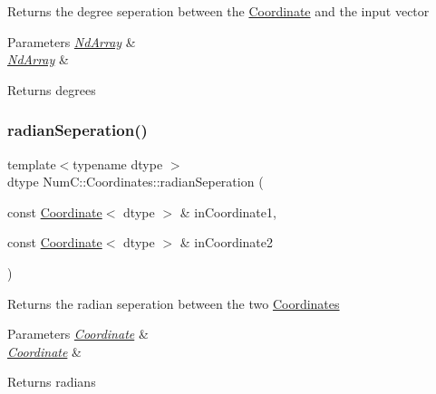 Returns the degree seperation between the \mbox{\hyperlink{class_num_c_1_1_coordinates_1_1_coordinate}{Coordinate}} and the input vector


\begin{DoxyParams}{Parameters}
{\em \mbox{\hyperlink{class_num_c_1_1_nd_array}{Nd\+Array}}} & \\
\hline
{\em \mbox{\hyperlink{class_num_c_1_1_nd_array}{Nd\+Array}}} & \\
\hline
\end{DoxyParams}
\begin{DoxyReturn}{Returns}
degrees 
\end{DoxyReturn}
\mbox{\label{namespace_num_c_1_1_coordinates_a480804b5ece54f2468163256c0fa8171}} 
\subsubsection{\texorpdfstring{radian\+Seperation()}{radianSeperation()}\hspace{0.1cm}{\footnotesize\ttfamily [1/2]}}
{\footnotesize\ttfamily template$<$typename dtype $>$ \\
dtype Num\+C\+::\+Coordinates\+::radian\+Seperation (\begin{DoxyParamCaption}\item[{const \mbox{\hyperlink{class_num_c_1_1_coordinates_1_1_coordinate}{Coordinate}}$<$ dtype $>$ \&}]{in\+Coordinate1,  }\item[{const \mbox{\hyperlink{class_num_c_1_1_coordinates_1_1_coordinate}{Coordinate}}$<$ dtype $>$ \&}]{in\+Coordinate2 }\end{DoxyParamCaption})}

Returns the radian seperation between the two \mbox{\hyperlink{namespace_num_c_1_1_coordinates}{Coordinates}}


\begin{DoxyParams}{Parameters}
{\em \mbox{\hyperlink{class_num_c_1_1_coordinates_1_1_coordinate}{Coordinate}}} & \\
\hline
{\em \mbox{\hyperlink{class_num_c_1_1_coordinates_1_1_coordinate}{Coordinate}}} & \\
\hline
\end{DoxyParams}
\begin{DoxyReturn}{Returns}
radians 
\end{DoxyReturn}
\mbox{\label{namespace_num_c_1_1_coordinates_a1e42c59854af0ce7ead309772211fcf4}} 
